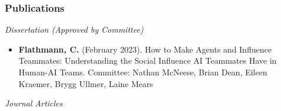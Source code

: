 \subsubsection*{Publications}

\bigskip \noindent
\textit{Dissertation (Approved by Committee)} 
\bigskip \noindent 

\begin{itemize}[align=left, labelwidth=3em,]
    \item[D.1] \textbf{Flathmann, C.} (February 2023). How to Make Agents and Influence Teammates: Understanding the Social Influence AI Teammates Have in Human-AI Teams. Committee: Nathan McNeese, Brian Dean, Eileen Kraemer, Brygg Ullmer, Laine Mears
\end{itemize}

\bigskip \noindent
\textit{Journal Articles}

